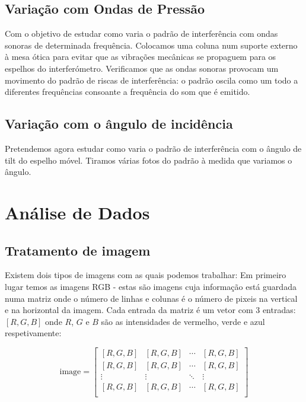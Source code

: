 \documentclass{article}
\begin{document}
\begin{multicols}{2}
\subsection{Variação com Ondas de Pressão}

Com o objetivo de estudar como varia o padrão de interferência com ondas sonoras de determinada frequência. 
Colocamos uma coluna num suporte externo à mesa ótica para evitar que as vibrações mecânicas se propaguem para os espelhos do interferómetro. 
Verificamos que as ondas sonoras provocam um movimento do padrão de riscas de interferência: o padrão oscila como um todo a diferentes frequências consoante a frequência do som que é emitido.

\subsection{Variação com o ângulo de incidência}

Pretendemos agora estudar como varia o padrão de interferência com o ângulo de tilt do espelho móvel.
Tiramos várias fotos do padrão à medida que variamos o ângulo.

\section{Análise de Dados}

\subsection{Tratamento de imagem}

Existem dois tipos de imagens com as quais podemos trabalhar:
Em primeiro lugar temos as imagens RGB - estas são imagens cuja informação está guardada numa matriz onde o número de linhas e colunas é o número de pixeis na vertical e na horizontal da imagem. 
Cada entrada da matriz é um vetor com 3 entradas: $[R, G, B]$ onde $R$, $G$ e $B$ são as intensidades de vermelho, verde e azul respetivamente:

\[ \text{image} = \begin{bmatrix}
  [R, G, B] & [R, G, B] & \cdots & [R, G, B] \\
  [R, G, B] & [R, G, B] & \cdots & [R, G, B] \\
  \vdots & \vdots & \ddots & \vdots \\
  [R, G, B] & [R, G, B] & \cdots & [R, G, B] \\ 
\end{bmatrix} \]


\end{multicols}
\end{document}
